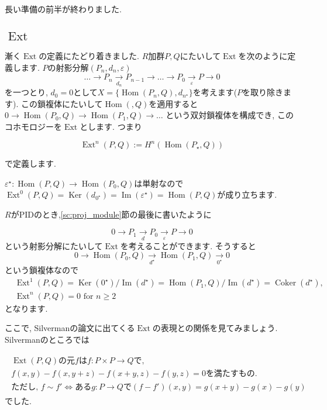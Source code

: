 \documentclass{jsarticle}
\newcommand{\makeop}[1]{\mathop{\mathrm{#1}}\nolimits}
\def\Im{\makeop{Im}}
\def\Ker{\makeop{Ker}}
\def\Hom{\makeop{Hom}}
\def\Ext{\makeop{Ext}}
\def\Coker{\makeop{Coker}}
\theoremstyle{definition}
\numberwithin{theorem}{section}
\begin{document}
長い準備の前半が終わりました.

\subsection{$\Ext$}
漸く$\Ext$の定義にたどり着きました.
$R$加群$P, Q$にたいして$\Ext$を次のように定義します. $P$の射影分解$(P_n, d_n, \varepsilon)$
\[
\ldots \rightarrow P_n \xrightarrow[d_n]{} P_{n-1} \rightarrow \ldots \rightarrow P_0 \xrightarrow[\varepsilon]{} P \rightarrow 0
\]
を一つとり, $d_0 = 0$として$X = \{\Hom(P_n, Q), d_{n^\star}\}$を考えます($P$を取り除きます).
この鎖複体にたいして$\Hom(, Q)$を適用すると$0\rightarrow \Hom(P_0, Q) \rightarrow \Hom(P_1, Q) \rightarrow \ldots$
という双対鎖複体を構成でき, このコホモロジーを$\Ext$とします. つまり

\begin{equation*}
\Ext^n(P, Q) := H^n(\Hom(P_\star, Q))
\end{equation*}

で定義します.

$\varepsilon^\star: \Hom(P, Q) \rightarrow \Hom(P_0, Q)$は単射なので
$\Ext^0(P, Q) = \Ker(d_{0^\star}) = \Im(\varepsilon^\star) = \Hom(P, Q)$が成り立ちます.

$R$がPIDのとき,\ref{sc:proj_module}節の最後に書いたように

\[
0 \rightarrow P_1 \xrightarrow[d]{} P_0 \xrightarrow[\varepsilon]{} P \rightarrow 0
\]
という射影分解にたいして$\Ext$を考えることができます. そうすると
\[
0 \rightarrow \Hom(P_0, Q) \xrightarrow[d^\star]{} \Hom(P_1, Q) \xrightarrow[0^\star]{} 0
\]
という鎖複体なので
\begin{align*}
& \Ext^1(P, Q) = \Ker(0^\star)/\Im(d^\star) = \Hom(P_1, Q)/\Im(d^\star) = \Coker(d^\star),\\
& \Ext^n(P, Q) = 0  \text{ for } n \geq 2
\end{align*}
となります.

ここで, Silvermanの論文に出てくる$\Ext$の表現との関係を見てみましょう. Silvermanのところでは

\begin{eqnarray}
\label{eq:silverman_ext_def}
\begin{array}{l}
\Ext(P, Q)\mbox{の元}fはf: P\times P \rightarrow Qで, \\
f(x, y) - f(x, y+z) - f(x+y, z) - f(y, z) = 0\mbox{を満たすもの.}\\
\mbox{ただし, }f\sim f' \Leftrightarrow ある g:P\rightarrow Qで(f-f')(x, y) = g(x+y) - g(x) - g(y)
\end{array}
\end{eqnarray}
でした.
\end{document}
